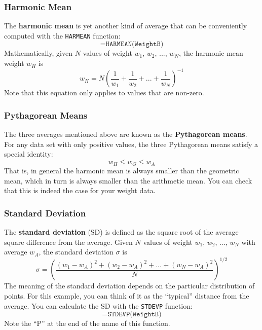 \subsubsection{Harmonic Mean}
The \textbf{harmonic mean} is yet another kind of average that can be conveniently computed with the \texttt{HARMEAN} function:
\begin{equation}
    \texttt{=HARMEAN(WeightB)}
\end{equation}
Mathematically, given $N$ values of weight $w_{1}$, $w_{2}$, ..., $w_{N}$, the harmonic mean weight $w_{H}$ is
\begin{equation}
    w_{H} = N \left( \frac{1}{w_{1}} + \frac{1}{w_{2}} + ... + \frac{1}{w_{N}} \right)^{-1}
\end{equation}
Note that this equation only applies to values that are non-zero.
\subsubsection{Pythagorean Means}
The three averages mentioned above are known as the \textbf{Pythagorean means}. For any data set with only positive values, the three Pythagorean means satisfy a special identity:
\begin{equation}
    w_{H} \leq w_{G} \leq w_{A}
\end{equation}
That is, in general the harmonic mean is always smaller than the geometric mean, which in turn is always smaller than the arithmetic mean. You can check that this is indeed the case for your weight data.
\subsubsection{Standard Deviation}
The \textbf{standard deviation} (SD) is defined as the square root of the average square difference from the average. Given $N$ values of weight $w_{1}$, $w_{2}$, ..., $w_{N}$ with average $w_{A}$, the standard deviation $\sigma$ is
\begin{equation}
    \sigma = \left( \frac{(w_{1} - w_{A})^{2} + (w_{2} - w_{A})^{2} + ... + (w_{N} - w_{A})^{2}}{N}  \right)^{1/2}
\end{equation}
The meaning of the standard deviation depends on the particular distribution of points. For this example, you can think of it as the ``typical'' distance from the average. You can calculate the SD with the \texttt{STDEVP} function:
\begin{equation}
    \texttt{=STDEVP(WeightB)}
\end{equation}
Note the ``P'' at the end of the name of this function.

